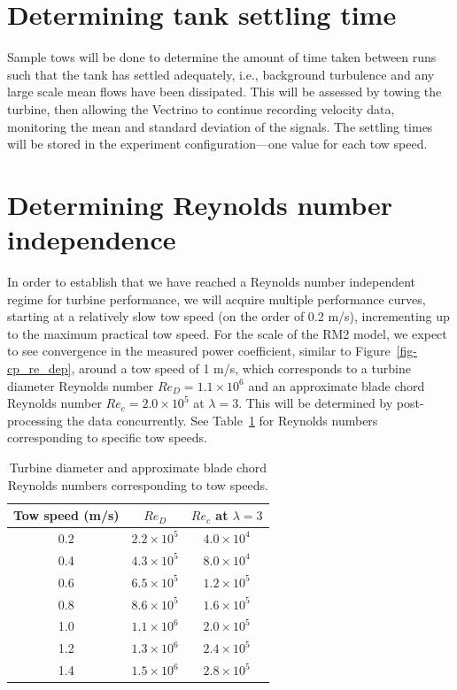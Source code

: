 \documentclass[12pt,letterpaper]{scrreprt}
\begin{document}
\section{Determining tank settling time}

Sample tows will be done to determine the amount of time taken between runs such
that the tank has settled adequately, i.e., background turbulence and any large
scale mean flows have been dissipated. This will be assessed by towing the
turbine, then allowing the Vectrino to continue recording velocity data,
monitoring the mean and standard deviation of the signals. The settling times
will be stored in the experiment configuration---one value for each tow speed.


\section{Determining Reynolds number independence}

In order to establish that we have reached a Reynolds number independent regime
for turbine performance, we will acquire multiple performance curves, starting
at a relatively slow tow speed (on the order of 0.2 m/s), incrementing up to the
maximum practical tow speed. For the scale of the RM2 model, we expect to see
convergence in the measured power coefficient, similar to
Figure~\ref{fig-cp_re_dep}, around a tow speed of 1 m/s, which corresponds to a
turbine diameter Reynolds number $Re_D = 1.1 \times 10^6$ and an approximate
blade chord Reynolds number $Re_c = 2.0 \times 10^5$ at $\lambda = 3$. This will
be determined by post-processing the data concurrently. See Table~\ref{tab-re}
for Reynolds numbers corresponding to specific tow speeds.

\begin{table}[ht]
\centering
\begin{tabular}{c|c|c}
Tow speed (m/s) & $Re_D$ & $Re_c$ at $\lambda = 3$ \\ 
\hline 
0.2 & $2.2 \times 10^5$ & $4.0 \times 10^4$ \\ 
0.4 & $4.3 \times 10^5$ & $8.0 \times 10^4$ \\ 
0.6 & $6.5 \times 10^5$ & $1.2 \times 10^5$ \\ 
0.8 & $8.6 \times 10^5$ & $1.6 \times 10^5$ \\ 
1.0 & $1.1 \times 10^6$ & $2.0 \times 10^5$ \\ 
1.2 & $1.3 \times 10^6$ & $2.4 \times 10^5$ \\ 
1.4 & $1.5 \times 10^6$ & $2.8 \times 10^5$ \\
\end{tabular} 
\caption{Turbine diameter and approximate blade chord Reynolds numbers
corresponding to tow speeds.} \label{tab-re}
\end{table}
\end{document}
